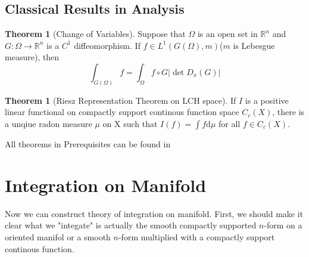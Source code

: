 \documentclass[b5paper,12pt]{article}
\newcommand{\bb}[1]{\mathbb{#1}}
\theoremstyle{definition}
\newtheorem{theo}[defn]{Theorem}
\begin{document}
\subsection{Classical Results in Analysis}
\begin{theo}[Change of Variables]
    Suppose that $\Omega$ is an open set in $\bb{R}^n$ and $G:\Omega \rightarrow \bb{R}^n$ is a $C^1$ diffeomorphism. If $f\in L^1(G(\Omega),m)$($m$ is Lebesgue measure), then
    \begin{equation}
        \int_{G(\Omega)}f=\int_{\Omega}f\circ  G \left\lvert \det D_x(G)\right\rvert
    \end{equation}
\end{theo}
\begin{theo}[Riesz Representation Theorem on LCH space]
    If $I$ is a positive linear functional on compactly support continous function space $C_c(X)$, there is a unqiue radon measure $\mu$ on X such that $I(f)=\int f\text{d}\mu$ for all $f\in C_c(X)$.
\end{theo}
All theorems in Prerequisites can be found in \cite{Folland} \cite{LoringTu}

\section{Integration on Manifold}
Now we can construct theory of integration on manifold. First, we should make it clear what we "integate" is actually the smooth compactly supported $n$-form on a oriented manifol or a smooth $n$-form multiplied with a compactly support continous function.
\end{document}
